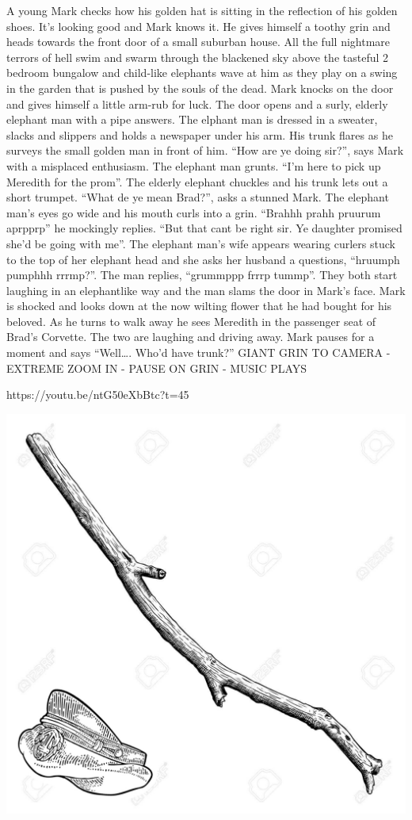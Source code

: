 A young Mark checks how his golden hat is sitting in the reflection of his golden shoes. It’s looking good and Mark knows it. He gives himself a toothy grin and heads towards the front door of a small suburban house. All the full nightmare terrors of hell swim and swarm through the blackened sky above the tasteful 2 bedroom bungalow and child-like elephants wave at him as they play on a swing in the garden that is pushed by the souls of the dead. Mark knocks on the door and gives himself a little arm-rub for luck. The door opens and a surly, elderly elephant man with a pipe answers. The elphant man is dressed in a sweater, slacks and slippers and holds a newspaper under his arm. His trunk flares as he surveys the small golden man in front of him. “How are ye doing sir?”, says Mark with a misplaced enthusiasm. The elephant man grunts. “I’m here to pick up Meredith for the prom”. The elderly elephant chuckles and his trunk lets out a short trumpet. “What de ye mean Brad?”, asks a stunned Mark. The elephant man’s eyes go wide and his mouth curls into a grin. “Brahhh prahh pruurum aprpprp” he mockingly replies. “But that cant be right sir. Ye daughter promised she’d be going with me”. The elephant man’s wife appears wearing curlers stuck to the top of her elephant head and she asks her husband a questions, “hruumph pumphhh rrrmp?”. The man replies, “grummppp frrrp tummp”. They both start laughing in an elephantlike way and the man slams the door in Mark’s face. Mark is shocked and looks down at the now wilting flower that he had bought for his beloved. As he turns to walk away he sees Meredith in the passenger seat of Brad’s Corvette. The two are laughing and driving away. Mark pauses for a moment and says “Well…. Who’d have trunk?” GIANT GRIN TO CAMERA - EXTREME ZOOM IN - PAUSE ON GRIN - MUSIC PLAYS \medskip

https://youtu.be/ntG50eXbBtc?t=45\medskip



\vspace*{5mm}

\begin{center}
\includegraphics[width=\textwidth]{./content/img/xxx.jpg}
\begin{figure}[h]
\end{figure}
\end{center}

\clearpage